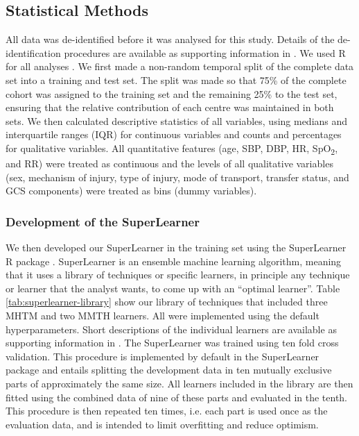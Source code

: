 \documentclass[10pt,letterpaper]{article}\usepackage[]{graphicx}\usepackage[]{color}
\begin{document}
\subsection*{Statistical Methods}
All data was de-identified before it was analysed for this study. Details of the
de-identification procedures are available as supporting information in
. We used R for all analyses \cite{R}. We first made a
non-random temporal split of the complete data set into a training and test
set. The split was made so that 75\% of the complete cohort was assigned to the
training set and the remaining 25\% to the test set, ensuring that the relative
contribution of each centre was maintained in both sets. We then calculated
descriptive statistics of all variables, using medians and interquartile ranges
(IQR) for continuous variables and counts and percentages for qualitative
variables. All quantitative features (age, SBP, DBP, HR, SpO\textsubscript{2},
and RR) were treated as continuous and the levels of all qualitative variables
(sex, mechanism of injury, type of injury, mode of transport, transfer status,
and GCS components) were treated as bins (dummy variables).

\subsubsection*{Development of the SuperLearner}
We then developed our SuperLearner in the training set using the SuperLearner R
package \cite{SuperLearner}. SuperLearner is an ensemble machine learning
algorithm, meaning that it uses a library of techniques or specific learners, in
principle any technique or learner that the analyst wants, to come up with an
``optimal learner''. Table \ref{tab:superlearner-library} show our library of
techniques that included three MHTM and two MMTH learners. All were implemented
using the default hyperparameters. Short descriptions of the individual learners
are available as supporting information in . The SuperLearner
was trained using ten fold cross validation. This procedure is implemented by
default in the SuperLearner package and entails splitting the development data
in ten mutually exclusive parts of approximately the same size. All learners
included in the library are then fitted using the combined data of nine of these
parts and evaluated in the tenth. This procedure is then repeated ten times,
i.e. each part is used once as the evaluation data, and is intended to limit
overfitting and reduce optimism.
\end{document}

